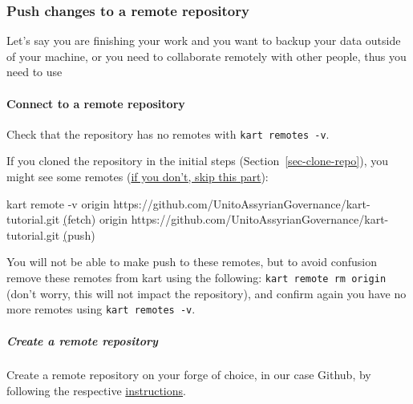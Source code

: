 \documentclass[
  letterpaper,
  DIV=11,
  numbers=noendperiod]{scrartcl}
\let\oldparagraph\paragraph
\renewcommand{\paragraph}[1]{\oldparagraph{#1}\mbox{}}
\let\oldsubparagraph\subparagraph
\renewcommand{\subparagraph}[1]{\oldsubparagraph{#1}\mbox{}}
\newenvironment{Shaded}{\begin{snugshade}}{\end{snugshade}}
\newcommand{\AttributeTok}[1]{\textcolor[rgb]{1.00,0.47,0.78}{#1}}
\newcommand{\ErrorTok}[1]{\textcolor[rgb]{1.00,0.33,0.33}{\underline{#1}}}
\newcommand{\ExtensionTok}[1]{\textcolor[rgb]{0.55,0.91,0.99}{#1}}
\newcommand{\KeywordTok}[1]{\textcolor[rgb]{1.00,0.47,0.78}{#1}}
\newcommand{\NormalTok}[1]{\textcolor[rgb]{0.97,0.97,0.95}{#1}}
\begin{document}
\subsubsection{Push changes to a remote
repository}\label{push-changes-to-a-remote-repository}

Let's say you are finishing your work and you want to backup your data
outside of your machine, or you need to collaborate remotely with other
people, thus you need to use

\paragraph{Connect to a remote
repository}\label{connect-to-a-remote-repository}

Check that the repository has no remotes with
\texttt{kart\ remotes\ -v}.

If you cloned the repository in the initial steps
(Section~\ref{sec-clone-repo}), you might see some remotes (\ul{if you
don't, skip this part}):

\begin{Shaded}
\begin{Highlighting}[]
\ExtensionTok{kart}\NormalTok{ remote }\AttributeTok{{-}v}
\ExtensionTok{origin}\NormalTok{  https://github.com/UnitoAssyrianGovernance/kart{-}tutorial.git }\ErrorTok{(}\ExtensionTok{fetch}\KeywordTok{)}
\ExtensionTok{origin}\NormalTok{  https://github.com/UnitoAssyrianGovernance/kart{-}tutorial.git }\ErrorTok{(}\ExtensionTok{push}\KeywordTok{)}
\end{Highlighting}
\end{Shaded}

You will not be able to make push to these remotes, but to avoid
confusion remove these remotes from kart using the following:
\texttt{kart\ remote\ rm\ origin} (don't worry, this will not impact the
repository), and confirm again you have no more remotes using
\texttt{kart\ remotes\ -v}.

\subparagraph{Create a remote
repository}\label{create-a-remote-repository}

Create a remote repository on your forge of choice, in our case Github,
by following the respective
\href{https://docs.github.com/en/repositories/creating-and-managing-repositories/creating-a-new-repository}{instructions}.
\end{document}
